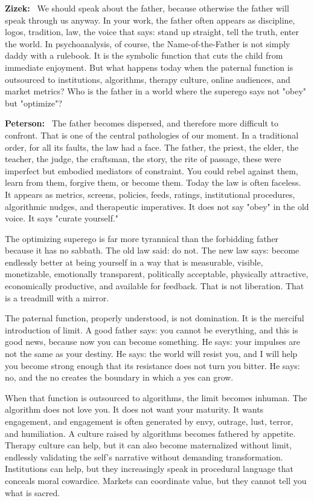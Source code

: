 \documentclass[a4paper,11pt]{article}
\newenvironment{question}{\par\noindent\color{ALIUSRed}\textbf{Zizek:}\ }{\par}
\newenvironment{answer}{\par\noindent\color{black}\textbf{Peterson:}\ }{\par}
\begin{document}
\begin{question}
We should speak about the father, because otherwise the father will speak through us anyway. In your work, the father often appears as discipline, logos, tradition, law, the voice that says: stand up straight, tell the truth, enter the world. In psychoanalysis, of course, the Name-of-the-Father is not simply daddy with a rulebook. It is the symbolic function that cuts the child from immediate enjoyment. But what happens today when the paternal function is outsourced to institutions, algorithms, therapy culture, online audiences, and market metrics? Who is the father in a world where the superego says not "obey" but "optimize"?
\end{question}

\begin{answer}
The father becomes dispersed, and therefore more difficult to confront. That is one of the central pathologies of our moment. In a traditional order, for all its faults, the law had a face. The father, the priest, the elder, the teacher, the judge, the craftsman, the story, the rite of passage, these were imperfect but embodied mediators of constraint. You could rebel against them, learn from them, forgive them, or become them. Today the law is often faceless. It appears as metrics, screens, policies, feeds, ratings, institutional procedures, algorithmic nudges, and therapeutic imperatives. It does not say "obey" in the old voice. It says "curate yourself."

The optimizing superego is far more tyrannical than the forbidding father because it has no sabbath. The old law said: do not. The new law says: become endlessly better at being yourself in a way that is measurable, visible, monetizable, emotionally transparent, politically acceptable, physically attractive, economically productive, and available for feedback. That is not liberation. That is a treadmill with a mirror.

The paternal function, properly understood, is not domination. It is the merciful introduction of limit. A good father says: you cannot be everything, and this is good news, because now you can become something. He says: your impulses are not the same as your destiny. He says: the world will resist you, and I will help you become strong enough that its resistance does not turn you bitter. He says: no, and the no creates the boundary in which a yes can grow.

When that function is outsourced to algorithms, the limit becomes inhuman. The algorithm does not love you. It does not want your maturity. It wants engagement, and engagement is often generated by envy, outrage, lust, terror, and humiliation. A culture raised by algorithms becomes fathered by appetite. Therapy culture can help, but it can also become maternalized without limit, endlessly validating the self's narrative without demanding transformation. Institutions can help, but they increasingly speak in procedural language that conceals moral cowardice. Markets can coordinate value, but they cannot tell you what is sacred.


\end{answer}
\end{document}
